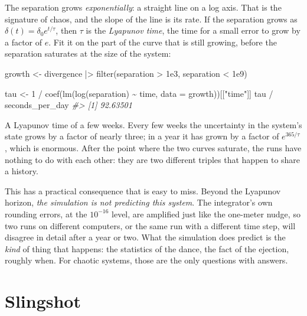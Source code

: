 \documentclass[
  10.5pt,
  letterpaper,
]{scrbook}
\newenvironment{Shaded}{\begin{snugshade}}{\end{snugshade}}
\newcommand{\AttributeTok}[1]{\textcolor[rgb]{0.00,0.00,0.00}{#1}}
\newcommand{\CommentTok}[1]{\textcolor[rgb]{0.00,0.00,0.00}{\textit{#1}}}
\newcommand{\DecValTok}[1]{\textcolor[rgb]{0.00,0.00,0.00}{#1}}
\newcommand{\FloatTok}[1]{\textcolor[rgb]{0.00,0.00,0.00}{#1}}
\newcommand{\FunctionTok}[1]{\textcolor[rgb]{0.00,0.00,0.00}{#1}}
\newcommand{\NormalTok}[1]{\textcolor[rgb]{0.00,0.00,0.00}{#1}}
\newcommand{\OtherTok}[1]{\textcolor[rgb]{0.00,0.00,0.00}{#1}}
\newcommand{\SpecialCharTok}[1]{\textcolor[rgb]{0.00,0.00,0.00}{#1}}
\newcommand{\StringTok}[1]{\textcolor[rgb]{0.00,0.00,0.00}{#1}}
\theoremstyle{definition}
\theoremstyle{plain}
\theoremstyle{remark}
\begin{document}
The separation grows \emph{exponentially}: a straight line on a log
axis. That is the signature of chaos, and the slope of the line is its
rate. If the separation grows as \(\delta(t) = \delta_0 e^{t/\tau}\),
then \(\tau\) is the \emph{Lyapunov time}, the time for a small error to
grow by a factor of \(e\). Fit it on the part of the curve that is still
growing, before the separation saturates at the size of the system:

\begin{Shaded}
\begin{Highlighting}[]
\NormalTok{growth }\OtherTok{\textless{}{-}}\NormalTok{ divergence }\SpecialCharTok{|\textgreater{}}
  \FunctionTok{filter}\NormalTok{(separation }\SpecialCharTok{\textgreater{}} \FloatTok{1e3}\NormalTok{, separation }\SpecialCharTok{\textless{}} \FloatTok{1e9}\NormalTok{)}

\NormalTok{tau }\OtherTok{\textless{}{-}} \DecValTok{1} \SpecialCharTok{/} \FunctionTok{coef}\NormalTok{(}\FunctionTok{lm}\NormalTok{(}\FunctionTok{log}\NormalTok{(separation) }\SpecialCharTok{\textasciitilde{}}\NormalTok{ time, }\AttributeTok{data =}\NormalTok{ growth))[[}\StringTok{"time"}\NormalTok{]]}
\NormalTok{tau }\SpecialCharTok{/}\NormalTok{ seconds\_per\_day}
\CommentTok{\#\textgreater{} [1] 92.63501}
\end{Highlighting}
\end{Shaded}

A Lyapunov time of a few weeks. Every few weeks the uncertainty in the
system's state grows by a factor of nearly three; in a year it has grown
by a factor of \(e^{365/\tau}\), which is enormous. After the point
where the two curves saturate, the runs have nothing to do with each
other: they are two different triples that happen to share a history.

This has a practical consequence that is easy to miss. Beyond the
Lyapunov horizon, \emph{the simulation is not predicting this system}.
The integrator's own rounding errors, at the \(10^{-16}\) level, are
amplified just like the one-meter nudge, so two runs on different
computers, or the same run with a different time step, will disagree in
detail after a year or two. What the simulation does predict is the
\emph{kind} of thing that happens: the statistics of the dance, the fact
of the ejection, roughly when. For chaotic systems, those are the only
questions with answers.

\section{Slingshot}\label{slingshot}
\end{document}

